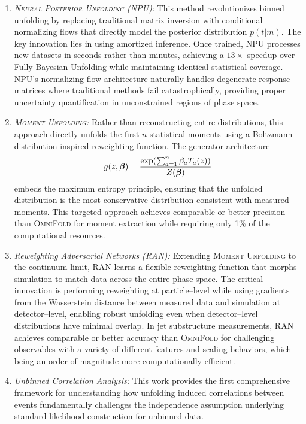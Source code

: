         \begin{enumerate}
            \item \emph{\textsc{Neural Posterior Unfolding} (NPU):} This method revolutionizes binned unfolding by replacing traditional matrix inversion with conditional normalizing flows that directly model the posterior distribution \(p(t|m)\).
            The key innovation lies in using amortized inference.
            Once trained, NPU processes new datasets in seconds rather than minutes, achieving a \( 13 \times \) speedup over Fully Bayesian Unfolding while maintaining identical statistical coverage.
            NPU's normalizing flow architecture naturally handles degenerate response matrices where traditional methods fail catastrophically, providing proper uncertainty quantification in unconstrained regions of phase space.
            \item \emph{\textsc{Moment Unfolding}:} Rather than reconstructing entire distributions, this approach directly unfolds the first \(n\) statistical moments using a Boltzmann distribution inspired reweighting function.
            The generator architecture \[g(z,\vb*{\beta}) = \frac{\exp(\sum_{a=1}^n \beta_a T_a(z))}{Z(\vb*{\beta})}\] embeds the maximum entropy principle, ensuring that the unfolded distribution is the most conservative distribution consistent with measured moments.
            This targeted approach achieves comparable or better precision than \textsc{OmniFold} for moment extraction while requiring only 1\(\%\) of the computational resources.
            \item \emph{Reweighting Adversarial Networks (RAN):} Extending \textsc{Moment Unfolding} to the continuum limit, RAN learns a flexible reweighting function that morphs simulation to match data across the entire phase space.
            The critical innovation is performing reweighting at particle--level while using gradients from the Wasserstein distance between measured data and simulation at detector--level, enabling robust unfolding even when detector--level distributions have minimal overlap.
            In jet substructure measurements, RAN achieves comparable or better accuracy than \textsc{OmniFold} for challenging observables with a variety of different features and scaling behaviors, which being an order of magnitude more computationally efficient.
            \item \emph{Unbinned Correlation Analysis:} This work provides the first comprehensive framework for understanding how unfolding induced correlations between events fundamentally challenges the independence assumption underlying standard likelihood construction for unbinned data.

\end{enumerate}

